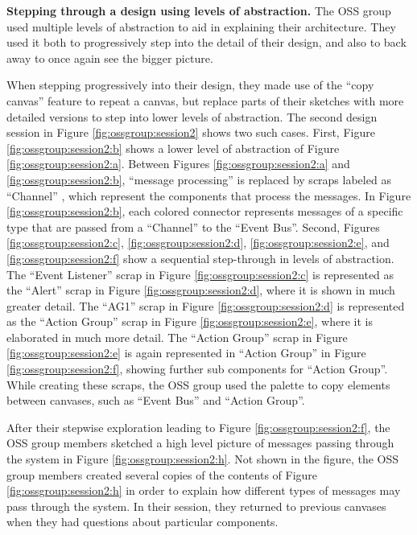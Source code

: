 \textbf{Stepping through a design using levels of abstraction. } The OSS group used multiple levels of abstraction to aid in explaining their architecture. They used it both to progressively step into the detail of their design, and also to back away to once again see the bigger picture.

When stepping progressively into their design, they made use of the ``copy canvas'' feature to repeat a canvas, but replace parts of their sketches with more detailed versions to step into lower levels of abstraction. The second design session in Figure \ref{fig:ossgroup:session2} shows two such cases. First, Figure \ref{fig:ossgroup:session2:b} shows a lower level of abstraction of Figure \ref{fig:ossgroup:session2:a}. Between Figures \ref{fig:ossgroup:session2:a} and \ref{fig:ossgroup:session2:b}, ``message processing'' is replaced by scraps labeled as ``Channel'' , which represent the components that process the messages.  In Figure \ref{fig:ossgroup:session2:b}, each colored connector represents messages of a specific type that are passed from a ``Channel'' to the ``Event Bus''. Second,  Figures \ref{fig:ossgroup:session2:c}, \ref{fig:ossgroup:session2:d}, \ref{fig:ossgroup:session2:e}, and \ref{fig:ossgroup:session2:f} show a sequential step-through in levels of abstraction. The ``Event Listener'' scrap in Figure \ref{fig:ossgroup:session2:c} is represented as the ``Alert'' scrap in Figure \ref{fig:ossgroup:session2:d}, where it is shown in much greater detail. The ``AG1'' scrap in Figure \ref{fig:ossgroup:session2:d} is represented as the ``Action Group'' scrap in Figure \ref{fig:ossgroup:session2:e}, where it is elaborated in much more detail. The ``Action Group'' scrap in Figure \ref{fig:ossgroup:session2:e} is again represented in ``Action Group'' in Figure \ref{fig:ossgroup:session2:f}, showing further sub components for ``Action Group''. While creating these scraps, the OSS group used the palette to copy elements between canvases, such as ``Event Bus'' and ``Action Group''.

After their stepwise exploration leading to Figure \ref{fig:ossgroup:session2:f}, the OSS group members sketched a high level picture of messages passing through the system in Figure \ref{fig:ossgroup:session2:h}. Not shown in the figure, the OSS group members created several copies of the contents of Figure \ref{fig:ossgroup:session2:h} in order to explain how different types of messages may pass through the system. In their session, they returned to previous canvases when they had questions about particular components.

